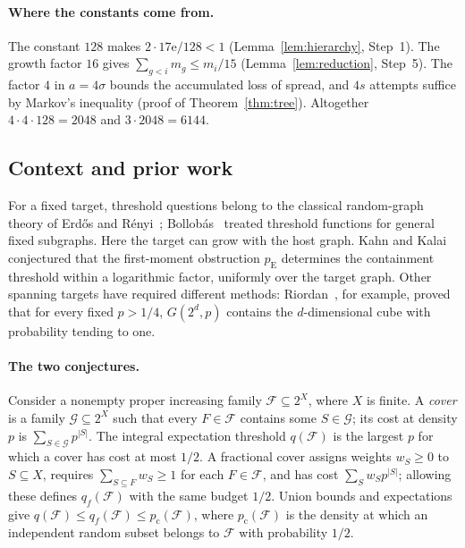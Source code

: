 \documentclass[11pt]{article}
\numberwithin{equation}{section}
\theoremstyle{remark}
\newcommand{\pE}{p_{\mathrm E}}
\newcommand{\ee}{\mathrm e}
\begin{document}
\paragraph{Where the constants come from.}
The constant $128$ makes $2\cdot17\ee/128<1$ (Lemma~\ref{lem:hierarchy},
Step~1). The growth factor $16$ gives $\sum_{g<i}m_g\le m_i/15$
(Lemma~\ref{lem:reduction}, Step~5). The factor $4$ in $a=4\sigma$
bounds the accumulated loss of spread, and $4s$ attempts suffice by
Markov's inequality (proof of Theorem~\ref{thm:tree}). Altogether
$4\cdot4\cdot128=2048$ and $3\cdot2048=6144$.

\subsection{Context and prior work}

For a fixed target, threshold questions belong to the classical
random-graph theory of Erd\H{o}s and R\'enyi~\cite{ER60};
Bollob\'as~\cite{Bollobas81} treated threshold functions for general
fixed subgraphs. Here the target can grow with the host graph. Kahn and
Kalai~\cite{KK07} conjectured that the first-moment obstruction $\pE$
determines the containment threshold within a logarithmic factor,
uniformly over the target graph. Other spanning targets have required
different methods: Riordan~\cite{Riordan00}, for example, proved that
for every fixed $p>1/4$, $G(2^d,p)$ contains the $d$-dimensional cube
with probability tending to one.

\paragraph{The two conjectures.}
Consider a nonempty proper increasing family $\mathcal F\subseteq2^X$,
where $X$ is finite. A \emph{cover} is a family $\mathcal G\subseteq2^X$
such that every $F\in\mathcal F$ contains some $S\in\mathcal G$; its
cost at density $p$ is $\sum_{S\in\mathcal G}p^{|S|}$. The integral
expectation threshold $q(\mathcal F)$ is the largest $p$ for which a
cover has cost at most $1/2$. A fractional cover assigns weights
$w_S\ge0$ to $S\subseteq X$, requires $\sum_{S\subseteq F}w_S\ge1$ for
each $F\in\mathcal F$, and has cost $\sum_Sw_Sp^{|S|}$; allowing these
defines $q_f(\mathcal F)$ with the same budget $1/2$. Union bounds and
expectations give
$q(\mathcal F)\le q_f(\mathcal F)\le p_{\mathrm c}(\mathcal F)$, where
$p_{\mathrm c}(\mathcal F)$ is the density at which an independent
random subset belongs to $\mathcal F$ with probability $1/2$.
\end{document}
